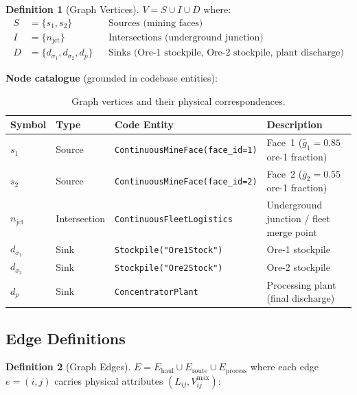 \documentclass[11pt,a4paper]{article}
\theoremstyle{definition}
\newtheorem{definition}{Definition}[section]
\begin{document}
\begin{definition}[Graph Vertices]
$V = S \cup I \cup D$ where:
\begin{align}
  S &= \{s_1, s_2\}            && \text{Sources (mining faces)} \\
  I &= \{n_{\text{jct}}\}       && \text{Intersections (underground junction)} \\
  D &= \{d_{\sigma_1}, d_{\sigma_2}, d_p\}
                                 && \text{Sinks (Ore-1 stockpile, Ore-2 stockpile, plant discharge)}
\end{align}
\end{definition}

\noindent
\textbf{Node catalogue} (grounded in codebase entities):

\begin{table}[H]
\centering
\caption{Graph vertices and their physical correspondences.}
\label{tab:nodes}
\begin{tabular}{@{}llll@{}}
\toprule
\textbf{Symbol} & \textbf{Type} & \textbf{Code Entity} & \textbf{Description} \\
\midrule
$s_1$                & Source       & \texttt{ContinuousMineFace(face\_id=1)} & Face~1 ($\bar{g}_1 = 0.85$ ore-1 fraction) \\
$s_2$                & Source       & \texttt{ContinuousMineFace(face\_id=2)} & Face~2 ($\bar{g}_2 = 0.55$ ore-1 fraction) \\
$n_{\text{jct}}$     & Intersection & \texttt{ContinuousFleetLogistics}       & Underground junction / fleet merge point \\
$d_{\sigma_1}$       & Sink         & \texttt{Stockpile("Ore1Stock")}         & Ore-1 stockpile \\
$d_{\sigma_2}$       & Sink         & \texttt{Stockpile("Ore2Stock")}         & Ore-2 stockpile \\
$d_p$                & Sink         & \texttt{ConcentratorPlant}              & Processing plant (final discharge) \\
\bottomrule
\end{tabular}
\end{table}

\subsection{Edge Definitions}

\begin{definition}[Graph Edges]
$E = E_{\text{haul}} \cup E_{\text{route}} \cup E_{\text{process}}$ where each
edge $e = (i,j)$ carries physical attributes $(L_{ij}, V_{ij}^{\max})$:
\end{definition}
\end{document}
